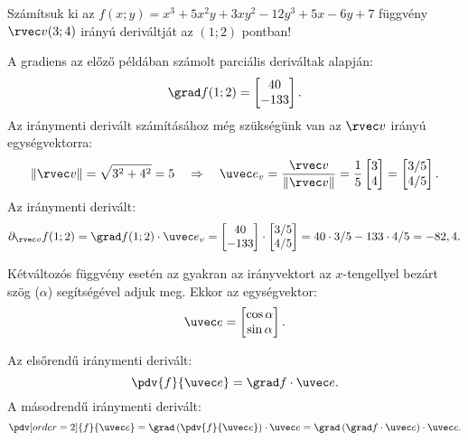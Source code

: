 \documentclass[a4paper, 12pt, fleqn]{scrartcl}
\begin{document}
\begin{example}
  Számítsuk ki az $f(x; y) = x^3 + 5x^2y + 3xy^2 - 12y^3 + 5x - 6y + 7$
  függvény $\rvec v(3;4)$ irányú deriváltját az $(1;2)$ pontban!

  A gradiens az előző példában számolt parciális deriváltak alapján:
  $$
    \grad f(1;2) = \begin{bmatrix}
      40 \\ -133
    \end{bmatrix}
    \text.
  $$
  Az iránymenti derivált számításához még szükségünk van az $\rvec v$ irányú
  egységvektorra:
  $$
    \|\rvec v\| = \sqrt{3^2 + 4^2} = 5
    \quad\Rightarrow\quad
    \uvec e_v = \frac{\rvec v}{\|\rvec v\|} = \frac{1}{5} \begin{bmatrix}
      3 \\ 4
    \end{bmatrix} = \begin{bmatrix}
      3/5 \\ 4/5
    \end{bmatrix}
    \text.
  $$
  Az iránymenti derivált:
  $$
    \partial_{\rvec v} f(1;2) = \grad f(1;2) \cdot \uvec e_v = \begin{bmatrix}
      40 \\ -133
    \end{bmatrix} \cdot \begin{bmatrix}
      3/5 \\ 4/5
    \end{bmatrix} = 40 \cdot 3/5 - 133 \cdot 4/5 = -82,4
    \text.
  $$
\end{example}


\begin{note}
  Kétváltozós függvény esetén az gyakran az irányvektort az $x$-tengellyel
  bezárt szög ($\alpha$) segítségével adjuk meg. Ekkor az egységvektor:
  $$
    \uvec e = \begin{bmatrix}
      \cos \alpha \\
      \sin \alpha
    \end{bmatrix}
    \text.
  $$
\end{note}

\begin{blueBox}

  Az elsőrendű iránymenti derivált:
  $$
    \pdv{f}{\uvec e} = \grad f \cdot \uvec e
    \text.
  $$
  A másodrendű iránymenti derivált:
  $$
    \pdv[order=2]{f}{\uvec e}
    = \grad \left(\pdv{f}{\uvec e}\right) \cdot \uvec e
    = \grad \left(\grad f \cdot \uvec e\right) \cdot \uvec e
    \text.
  $$
\end{blueBox}
\end{document}
